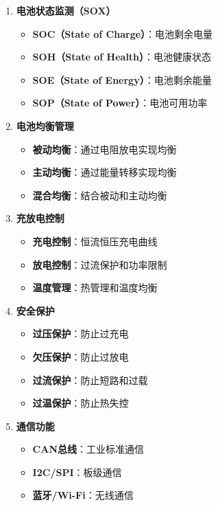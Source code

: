 \documentclass[12pt,UTF8]{ctexbook}
\begin{document}
\begin{enumerate}
    \item \textbf{电池状态监测（SOX）}
    \begin{itemize}
        \item \textbf{SOC（State of Charge）}：电池剩余电量
        \item \textbf{SOH（State of Health）}：电池健康状态
        \item \textbf{SOE（State of Energy）}：电池剩余能量
        \item \textbf{SOP（State of Power）}：电池可用功率
    \end{itemize}
    
    \item \textbf{电池均衡管理}
    \begin{itemize}
        \item \textbf{被动均衡}：通过电阻放电实现均衡
        \item \textbf{主动均衡}：通过能量转移实现均衡
        \item \textbf{混合均衡}：结合被动和主动均衡
    \end{itemize}
    
    \item \textbf{充放电控制}
    \begin{itemize}
        \item \textbf{充电控制}：恒流恒压充电曲线
        \item \textbf{放电控制}：过流保护和功率限制
        \item \textbf{温度管理}：热管理和温度均衡
    \end{itemize}
    
    \item \textbf{安全保护}
    \begin{itemize}
        \item \textbf{过压保护}：防止过充电
        \item \textbf{欠压保护}：防止过放电
        \item \textbf{过流保护}：防止短路和过载
        \item \textbf{过温保护}：防止热失控
    \end{itemize}
    
    \item \textbf{通信功能}
    \begin{itemize}
        \item \textbf{CAN总线}：工业标准通信
        \item \textbf{I2C/SPI}：板级通信
        \item \textbf{蓝牙/Wi-Fi}：无线通信
    \end{itemize}
\end{enumerate}
\end{document}
